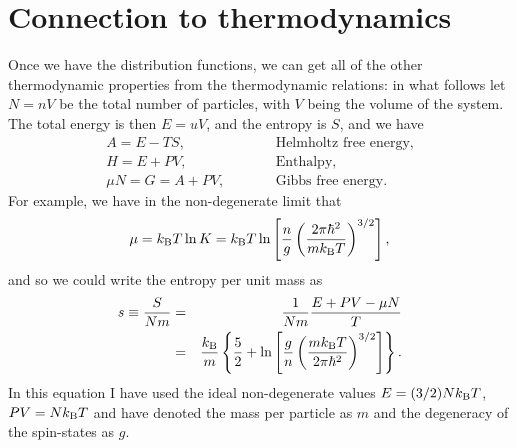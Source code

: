 \section{Connection to thermodynamics}
Once we have the distribution functions, we can get all of the other thermodynamic properties from the thermodynamic relations: in what follows let $N = nV$ be the total number of particles, with $V$ being the volume of the system.  The total energy is then $E = uV$, and the entropy is $S$, and we have
\begin{eqnarray}
A = E - TS, &\qquad& \textrm{Helmholtz free energy,}\\
H = E + PV, &\qquad& \textrm{Enthalpy,}\\
\mu N = G = A + PV, &\qquad& \textrm{Gibbs free energy}.
\end{eqnarray}
For example, we have in the non-degenerate limit that
\begin{equation}
\mu = k_\mathrm{B} T\ln K = k_\mathrm{B} T\ln\left[ \frac{n}{g}\left(\frac{2\pi\hbar^{2}}{mk_\mathrm{B} T}\right)^{3/2}\right],
\end{equation}
and so we could write the entropy per unit mass as
\begin{eqnarray}
s \equiv \frac{S}{Nm} &=& \frac{1}{Nm}\frac{E + PV - \mu N}{T}\nonumber\\
 &=& \frac{k_\mathrm{B} }{m}\left\{ \frac{5}{2} + \ln\left[\frac{g}{n}\left(\frac{mk_\mathrm{B} T}{2\pi\hbar^{2}}\right)^{3/2}\right]\right\}.
 \end{eqnarray}
In this equation I have used the ideal non-degenerate values $E = (3/2) Nk_\mathrm{B} T$, $PV = Nk_\mathrm{B} T$ and have denoted the mass per particle as $m$ and the degeneracy of the spin-states as $g$.

